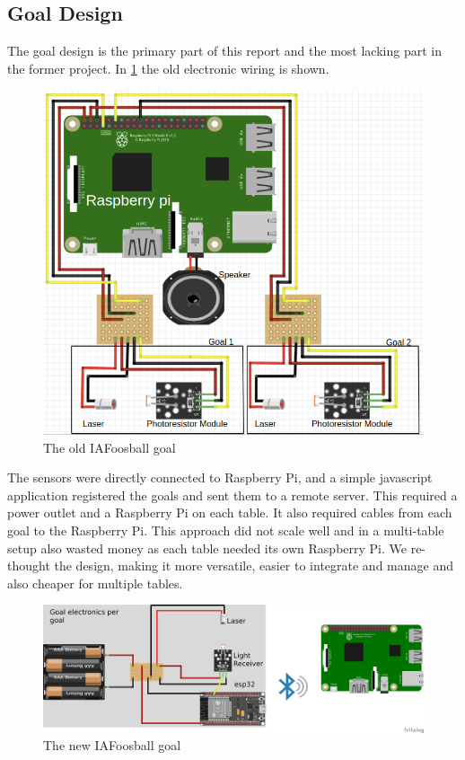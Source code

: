 \subsection{Goal Design}
The goal design is the primary part of this report and the most lacking part in the former project. 
In \cref{fig:goalOld} the old electronic wiring is shown.

\begin{figure}[h!]
    \centering
    \includegraphics[scale=0.3]{figures/goal-old.png}
    \caption{The old IAFoosball goal}\label{fig:goalOld}
\end{figure}

The sensors were directly connected to Raspberry Pi, and a simple javascript application registered the goals and sent them to a remote server. This required a power outlet and a Raspberry Pi on each table. It also required cables from each goal to the Raspberry Pi. This approach did not scale well and in a multi-table setup also wasted money as each table needed its own Raspberry Pi. We re-thought the design, making it more versatile, easier to integrate and manage and also cheaper for multiple tables.

\begin{figure}[h!]
    \centering
    \includegraphics[scale=0.4]{figures/goal-new.png}%
    \caption{The new IAFoosball goal}\label{fig:goalNew}
\end{figure}

